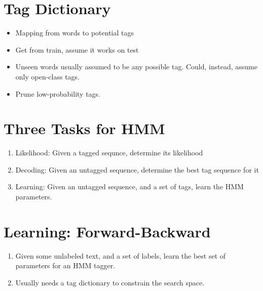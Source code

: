 \documentclass[11pt,letterpaper]{article}
\begin{document}



\section{Tag Dictionary}

\begin{itemize}
  \item Mapping from words to potential tags
  \item Get from train, assume it works on test
  \item Unseen words usually assumed to be any possible tag.  Could, instead, assume only open-class tags.
  \item Prune low-probability tags.
\end{itemize}



\section{Three Tasks for HMM}

\begin{enumerate}
  \item Likelihood: Given a tagged sequnce, determine its likelihood
  \item Decoding: Given an untagged sequence, determine the best tag sequence for it
  \item Learning: Given an untagged sequence, and a set of tags, learn the HMM parameters.
\end{enumerate}


\section{Learning: Forward-Backward}

\begin{enumerate}
  \item Given some unlabeled text, and a set of labels, learn the best set of parameters for an HMM tagger.
  \item Usually needs a tag dictionary to constrain the search space.
  
\end{enumerate}
\end{document}
